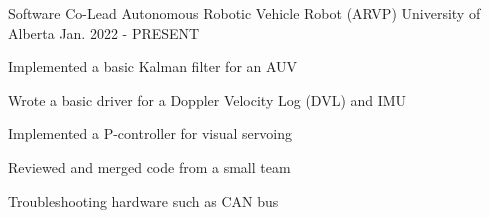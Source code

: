

\begin{cventries}

  \cventry
    {Software Co-Lead} %
    {Autonomous Robotic Vehicle Robot (ARVP)} %
    {University of Alberta} %
    {Jan. 2022 - PRESENT} %
    {
      \begin{cvitems} %
        \item Implemented a basic Kalman filter for an AUV
        \item Wrote a basic driver for a Doppler Velocity Log (DVL) and IMU
        \item Implemented a P-controller for visual servoing
        \item Reviewed and merged code from a small team
        \item Troubleshooting hardware such as CAN bus 
      \end{cvitems}
    }


\end{cventries}

